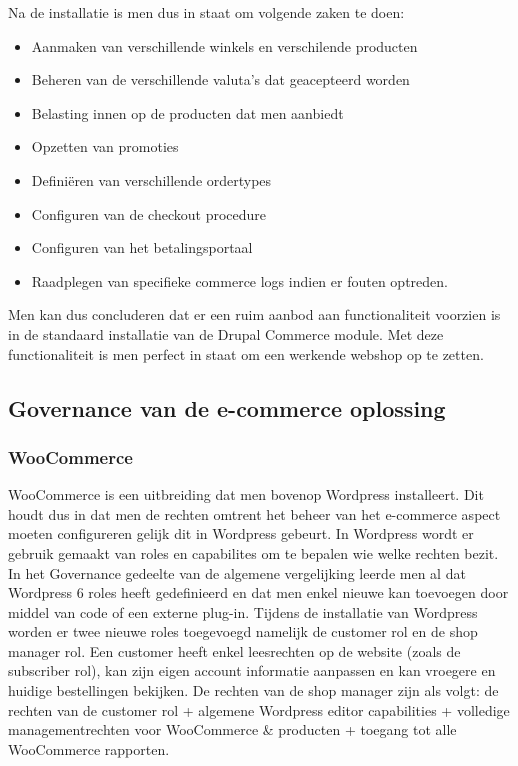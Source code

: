 Na de installatie is men dus in staat om volgende zaken te doen:
\begin{itemize}
	\item Aanmaken van verschillende winkels en verschilende producten
	\item Beheren van de verschillende valuta's dat geacepteerd worden
	\item Belasting innen op de producten dat men aanbiedt
	\item Opzetten van promoties 
	\item Definiëren van verschillende ordertypes
	\item Configuren van de checkout procedure
	\item Configuren van het betalingsportaal
	\item Raadplegen van specifieke commerce logs indien er fouten optreden.
\end{itemize}

Men kan dus concluderen dat er een ruim aanbod aan functionaliteit voorzien is in de standaard installatie van de Drupal Commerce module. Met deze functionaliteit is men perfect in staat om een werkende webshop op te zetten.
\subsection{Governance van de e-commerce oplossing}
\subsubsection{WooCommerce}
WooCommerce is een uitbreiding dat men bovenop Wordpress installeert. Dit houdt dus in dat men de rechten omtrent het beheer van het e-commerce aspect moeten configureren gelijk dit in Wordpress gebeurt. In Wordpress wordt er gebruik gemaakt van roles en capabilites om te bepalen wie welke rechten bezit. In het Governance gedeelte van de algemene vergelijking leerde men al dat Wordpress 6 roles heeft gedefinieerd en dat men enkel nieuwe kan toevoegen door middel van code of een externe plug-in. Tijdens de installatie van Wordpress worden er twee nieuwe roles toegevoegd namelijk de customer rol en de shop manager rol. Een customer heeft enkel leesrechten op de website (zoals de subscriber rol), kan zijn eigen account informatie aanpassen en kan vroegere en huidige bestellingen bekijken. De rechten van de shop manager zijn als volgt: de rechten van de customer rol + algemene Wordpress editor capabilities + volledige managementrechten voor WooCommerce \& producten + toegang tot alle WooCommerce rapporten.
